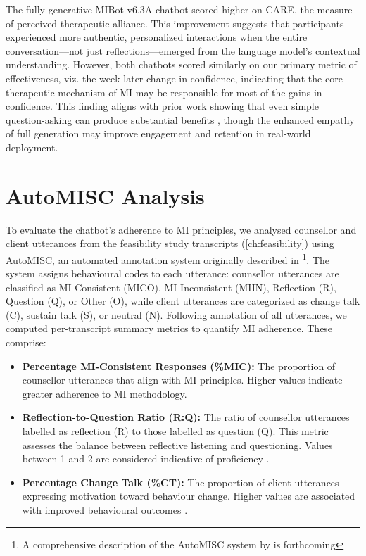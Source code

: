 The fully generative MIBot v6.3A chatbot scored higher on CARE, the measure of perceived therapeutic alliance. This improvement suggests that participants experienced more authentic, personalized interactions when the entire conversation---not just reflections---emerged from the language model's contextual understanding. However, both chatbots scored similarly on our primary metric of effectiveness, viz. the week-later change in confidence, indicating that the core therapeutic mechanism of MI may be responsible for most of the gains in confidence. This finding aligns with prior work showing that even simple question-asking can produce substantial benefits \citep{brown2023mi}, though the enhanced empathy of full generation may improve engagement and retention in real-world deployment.

\section{AutoMISC Analysis}
\label{sec:mi-adherence}

To evaluate the chatbot's adherence to MI principles, we analysed counsellor and client utterances from the feasibility study transcripts (\cref{ch:feasibility}) using AutoMISC, an automated annotation system originally described in \citet{mahmood-etal-2025-fully}\footnote{A comprehensive description of the AutoMISC system by \citet{ali2025automated} is forthcoming}.
The system assigns behavioural codes to each utterance: counsellor utterances are classified as MI-Consistent (MICO), MI-Inconsistent (MIIN), Reflection (R), Question (Q), or Other (O), while client utterances are categorized as change talk (C), sustain talk (S), or neutral (N). Following annotation of all utterances, we computed per-transcript summary metrics to quantify MI adherence. These comprise:

\begin{itemize}

    \item \textbf{Percentage MI-Consistent Responses (\%MIC):} The proportion of counsellor utterances that align with MI principles. Higher values indicate greater adherence to MI methodology.
    
    \item \textbf{Reflection-to-Question Ratio (R:Q):} The ratio of counsellor utterances labelled as reflection (R) to those labelled as question (Q). This metric assesses the balance between reflective listening and questioning. Values between 1 and 2 are considered indicative of proficiency \citep{moyers2016miti}.

    \item \textbf{Percentage Change Talk (\%CT):} The proportion of client utterances expressing motivation toward behaviour change. Higher values are associated with improved behavioural outcomes \citep{Apodaca2009}.

\end{itemize}

